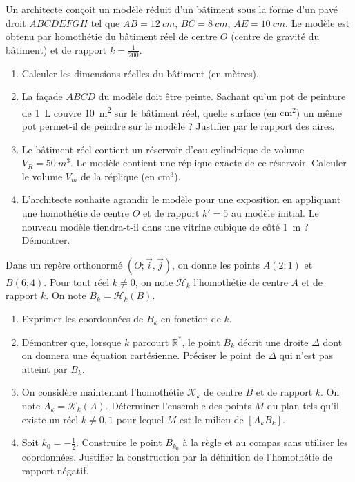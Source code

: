 \documentclass[11pt]{article}
\begin{document}
\begin{exercice}
Un architecte conçoit un modèle réduit d'un bâtiment sous la forme d'un pavé droit $ABCDEFGH$ tel que $AB = \SI{12}{cm}$, $BC = \SI{8}{cm}$, $AE = \SI{10}{cm}$. Le modèle est obtenu par homothétie du bâtiment réel de centre $O$ (centre de gravité du bâtiment) et de rapport $k = \frac{1}{200}$.
\begin{enumerate}
    \item Calculer les dimensions réelles du bâtiment (en mètres).
    \item La façade $ABCD$ du modèle doit être peinte. Sachant qu'un pot de peinture de \SI{1}{L} couvre \SI{10}{m^2} sur le bâtiment réel, quelle surface (en $\text{cm}^2$) un même pot permet-il de peindre sur le modèle ? Justifier par le rapport des aires.
    \item Le bâtiment réel contient un réservoir d'eau cylindrique de volume $V_R = \SI{50}{m^3}$. Le modèle contient une réplique exacte de ce réservoir. Calculer le volume $V_m$ de la réplique (en $\text{cm}^3$).
    \item L'architecte souhaite agrandir le modèle pour une exposition en appliquant une homothétie de centre $O$ et de rapport $k' = 5$ au modèle initial. Le nouveau modèle tiendra-t-il dans une vitrine cubique de côté \SI{1}{m} ? Démontrer.
\end{enumerate}
\end{exercice}

\begin{exercice}
Dans un repère orthonormé $(O; \overrightarrow{i}, \overrightarrow{j})$, on donne les points $A(2;1)$ et $B(6;4)$. Pour tout réel $k \neq 0$, on note $\mathcal{H}_k$ l'homothétie de centre $A$ et de rapport $k$. On note $B_k = \mathcal{H}_k(B)$.
\begin{enumerate}
    \item Exprimer les coordonnées de $B_k$ en fonction de $k$.
    \item Démontrer que, lorsque $k$ parcourt $\mathbb{R}^*$, le point $B_k$ décrit une droite $\Delta$ dont on donnera une équation cartésienne. Préciser le point de $\Delta$ qui n'est pas atteint par $B_k$.
    \item On considère maintenant l'homothétie $\mathcal{K}_k$ de centre $B$ et de rapport $k$. On note $A_k = \mathcal{K}_k(A)$. Déterminer l'ensemble des points $M$ du plan tels qu'il existe un réel $k \neq 0, 1$ pour lequel $M$ est le milieu de $[A_k B_k]$.
    \item Soit $k_0 = -\frac{1}{2}$. Construire le point $B_{k_0}$ à la règle et au compas sans utiliser les coordonnées. Justifier la construction par la définition de l'homothétie de rapport négatif.
\end{enumerate}
\end{exercice}
\end{document}
